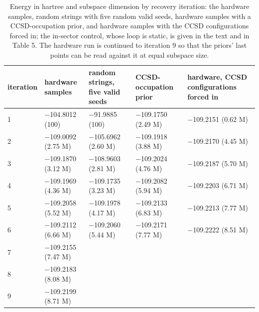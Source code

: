 \documentclass[11pt]{article}
\begin{document}
\begin{table}[htbp]
\centering
\caption{Energy in hartree and subspace dimension by recovery iteration: the hardware samples, random strings with five random valid seeds, hardware samples with a CCSD-occupation prior, and hardware samples with the CCSD configurations forced in; the in-sector control, whose loop is static, is given in the text and in Table 5. The hardware run is continued to iteration 9 so that the priors' last points can be read against it at equal subspace size.}\label{tab:4}
\small
\renewcommand{\arraystretch}{1.3}

\begin{tabularx}{\linewidth}{@{}ll>{\hsize=0.901\hsize\raggedright\arraybackslash}Xl>{\hsize=1.099\hsize\raggedright\arraybackslash}X@{}}
\toprule
iteration & hardware samples & random strings, five valid seeds & CCSD-occupation prior & hardware, CCSD configurations forced in \\
\midrule
1 & $-$104.8012 (100) & $-$91.9885 (100) & $-$109.1750 (2.49 M) & $-$109.2151 (0.62 M) \\
2 & $-$109.0092 (2.75 M) & $-$105.6962 (2.60 M) & $-$109.1918 (3.88 M) & $-$109.2170 (4.45 M) \\
3 & $-$109.1870 (3.12 M) & $-$108.9603 (2.81 M) & $-$109.2024 (4.76 M) & $-$109.2187 (5.70 M) \\
4 & $-$109.1969 (4.36 M) & $-$109.1735 (3.23 M) & $-$109.2082 (5.94 M) & $-$109.2203 (6.71 M) \\
5 & $-$109.2058 (5.52 M) & $-$109.1978 (4.17 M) & $-$109.2133 (6.83 M) & $-$109.2213 (7.77 M) \\
6 & $-$109.2112 (6.66 M) & $-$109.2060 (5.44 M) & $-$109.2171 (7.77 M) & $-$109.2222 (8.51 M) \\
7 & $-$109.2155 (7.47 M) &  &  &  \\
8 & $-$109.2183 (8.08 M) &  &  &  \\
9 & $-$109.2199 (8.71 M) &  &  &  \\
\bottomrule
\end{tabularx}
\end{table}
\end{document}
